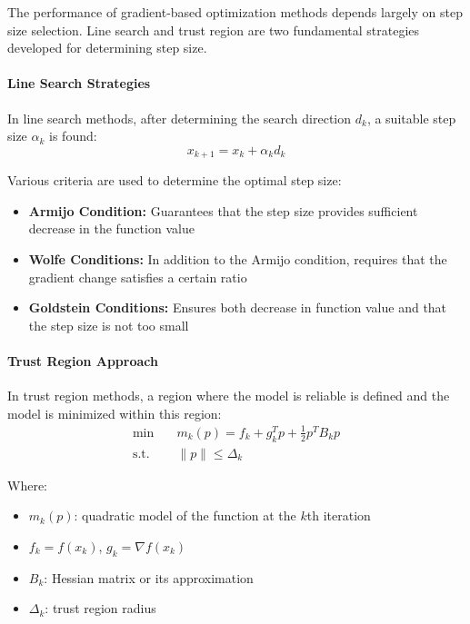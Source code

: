 The performance of gradient-based optimization methods depends largely on step size selection. Line search and trust region are two fundamental strategies developed for determining step size.

\paragraph{Line Search Strategies}
In line search methods, after determining the search direction $d_k$, a suitable step size $\alpha_k$ is found:
\begin{equation}
x_{k+1} = x_k + \alpha_k d_k
\end{equation}

Various criteria are used to determine the optimal step size:
\begin{itemize}
    \item \textbf{Armijo Condition:} Guarantees that the step size provides sufficient decrease in the function value
    \item \textbf{Wolfe Conditions:} In addition to the Armijo condition, requires that the gradient change satisfies a certain ratio
    \item \textbf{Goldstein Conditions:} Ensures both decrease in function value and that the step size is not too small
\end{itemize}

\paragraph{Trust Region Approach}
In trust region methods, a region where the model is reliable is defined and the model is minimized within this region:
\begin{equation}
\begin{aligned}
\min & \quad m_k(p) = f_k + g_k^Tp + \frac{1}{2}p^TB_kp \\
\text{s.t.} & \quad \|p\| \leq \Delta_k
\end{aligned}
\end{equation}

Where:
\begin{itemize}
    \item $m_k(p)$: quadratic model of the function at the $k$th iteration
    \item $f_k = f(x_k)$, $g_k = \nabla f(x_k)$
    \item $B_k$: Hessian matrix or its approximation
    \item $\Delta_k$: trust region radius
\end{itemize}

